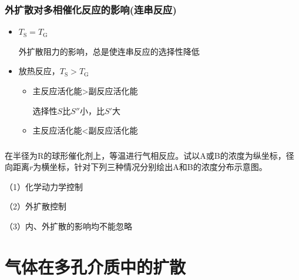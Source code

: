 \documentclass[dvipsnames, svgnames, x11names]{beamer}
\begin{document}
\begin{frame}
    \frametitle{外扩散对多相催化反应的影响(连串反应)}

    \begin{itemize}
        \item $T_\mathrm{S} = T_\mathrm{G}$
        
        外扩散阻力的影响，总是使连串反应的选择性降低
        \item 放热反应，$T_\mathrm{S} > T_\mathrm{G}$
            \begin{itemize}
                \item[\bullet] 主反应活化能>副反应活化能
                
                选择性$S$比$S''$小，比$S'$大
                \item[\bullet] 主反应活化能<副反应活化能
            \end{itemize}
    \end{itemize}
\end{frame}


\begin{frame}[t]
    \frametitle{}

    \begin{example}
        在半径为R的球形催化剂上，等温进行气相反应。试以A或B的浓度为纵坐标，径向距离$r$为横坐标，针对下列三种情况分别绘出A和B的浓度分布示意图。
    
    （1）化学动力学控制

    （2）外扩散控制

    （3）内、外扩散的影响均不能忽略

    \end{example}

\end{frame}


\section{气体在多孔介质中的扩散}
\end{document}
